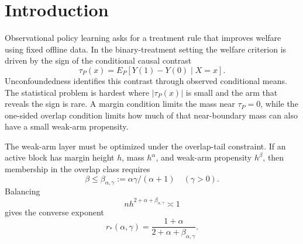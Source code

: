 \documentclass[11pt]{article}
\theoremstyle{definition}
\theoremstyle{plain}
\theoremstyle{remark}
\begin{document}
\begin{abstract}
The achievability theorem is stated in a primitive known-logging finite-cell
regime.  The logging propensity is known exactly on a known finite partition,
the outcome regressions are cell-constant, the estimator uses truncated
cross-fitted empirical cell means, and a displayed rare-arm cell-count
envelope makes the clipped-score drift a derived quantity.  This upper theorem
does not require the one-sided overlap-decay condition; the parameter
\(\gamma\) enters the statement only through the deterministic clipping
sequence \(q_n^*=q(h_n^*)\).  No high-level target-rate nuisance assumption
and no sup-norm propensity localization are assumed.  The resulting
data-and-design estimator is a target-preserving clipped-AIPW empirical
welfare maximizer with
\[
h_n^*=n^{-1/(2+\alpha+\beta_{\alpha,\gamma})},\qquad
q_n^*=q(h_n^*),
\]
and expected regret bounded by
\[
\bar\rho_n^*
=(h_n^*)^{1+\alpha}
\{\log(e/(h_n^*)^{1+\alpha})\}^{(1+\alpha)/(2+\alpha)}.
\]
Thus the upper theorem matches the lower polynomial exponent on any
uniform primitive finite-cell collection that is also rich enough to contain
the weak-overlap witnesses.  Over the larger weak-overlap class with unknown
nuisance functions, the exact data-only feasible rate remains open; in
particular, ordinary \(L_2(P_X)\) propensity control alone creates an
estimated-clipping variance term that is not removed by the primitive
assumptions of the full lower-bound class.
\end{abstract}

\section{Introduction}
Observational policy learning asks for a treatment rule that improves welfare
using fixed offline data.  In the binary-treatment setting the welfare
criterion is driven by the sign of the conditional causal contrast
\[
\tau_P(x)=E_P[Y(1)-Y(0)\mid X=x].
\]
Unconfoundedness identifies this contrast through observed conditional means.
The statistical problem is hardest where \(|\tau_P(x)|\) is small and the arm
that reveals the sign is rare.  A margin condition limits the mass near
\(\tau_P=0\), while the one-sided overlap condition limits how much of that
near-boundary mass can also have a small weak-arm propensity.

The weak-arm layer must be optimized under the overlap-tail constraint.  If
an active block has margin height \(h\), mass \(h^\alpha\), and weak-arm
propensity \(h^\beta\), then membership in the overlap class requires
\[
\beta\le \beta_{\alpha,\gamma}:=\alpha\gamma/(\alpha+1)
\quad(\gamma>0).
\]
Balancing
\[
n h^{2+\alpha+\beta_{\alpha,\gamma}}\asymp1
\]
gives the converse exponent
\[
r_*(\alpha,\gamma)=
\frac{1+\alpha}{2+\alpha+\beta_{\alpha,\gamma}}.
\]
\end{document}
